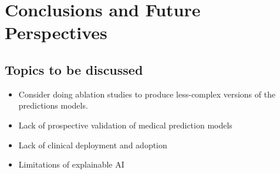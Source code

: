 \chapter{Conclusions and Future Perspectives}
\label{conclusions}

\section{Topics to be discussed}
\begin{itemize}
    \item Consider doing ablation studies to produce less-complex versions
        of the predictions models.
    \item Lack of prospective validation of medical prediction models
    \item Lack of clinical deployment and adoption 
    \item Limitations of explainable AI
\end{itemize}


